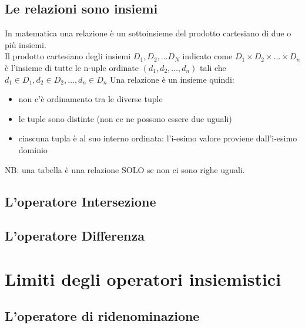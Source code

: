 \subsection{Le relazioni sono insiemi}
In matematica una relazione è un sottoinsieme del prodotto cartesiano di due o più insiemi.
\\Il prodotto cartesiano degli insiemi $D_1, D_2, \dots D_N$ indicato come $D_1 \times D_2 \times \dots \times D_n$ è l'insieme di tutte le n-uple ordinate $(d_1,d_2,\dots,d_n)$ tali che $d_1 \in D_1, d_2 \in D_2, \dots , d_n \in D_n$
Una relazione è un insieme quindi:
\begin{itemize}
    \item non c'è ordinamento tra le diverse tuple
    \item le tuple sono distinte (non ce ne possono essere due uguali)
    \item ciascuna tupla è al suo interno ordinata: l'i-esimo valore proviene dall'i-esimo dominio
\end{itemize}
NB: una tabella è una relazione SOLO se non ci sono righe uguali.
\subsection{L'operatore Intersezione}
\subsection{L'operatore Differenza}

\section{Limiti degli operatori insiemistici}
\subsection{L'operatore di ridenominazione}






